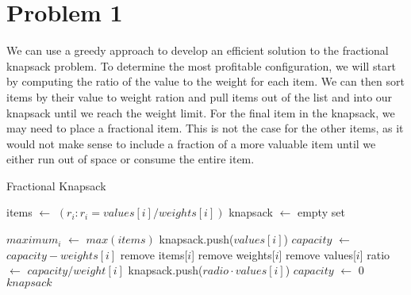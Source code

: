 \documentclass{article}
\newenvironment{problem}[1]{
  \nobreak\section*{Problem #1}
}{}
\newcommand*{\Let}[2]{\State #1 $\gets$ #2}
\begin{document}
  \begin{problem}{1}
    We can use a greedy approach to develop an efficient solution to
    the fractional knapsack problem.  To determine the most 
    profitable configuration, we will start by computing the ratio
    of the value to the weight for each item.  We can then sort items
    by their value to weight ration and pull items out of the list
    and into our knapsack until we reach the weight limit.  For the
    final item in the knapsack, we may need to place a fractional
    item.  This is not the case for the other items, as it would not
    make sense to include a fraction of a more valuable item until
    we either run out of space or consume the entire item.

    \begin{algorithm}
      \caption{Fractional Knapsack}
      \begin{algorithmic}[1]
          \Let{items}{$(r_i : r_i = values[i] / weights[i])$}
          \Let{knapsack}{empty set}

            \Let{$maximum_i$}{$max(items)$}
              \State knapsack.push($values[i]$)
              \Let{$capacity$}{$capacity - weights[i]$}
              \State remove items[$i$]
              \State remove weights[$i$]
              \State remove values[$i$]
            \Else
              \Let{ratio}{$capacity / weight[i]$}
              \State knapsack.push($radio \cdot values[i]$)
              \Let{$capacity$}{$0$}
            \EndIf
          \EndWhile
          \State \Return $knapsack$
        \EndFunction
      \end{algorithmic}
    \end{algorithm}
  \end{problem}

  \pagebreak
\end{document}
